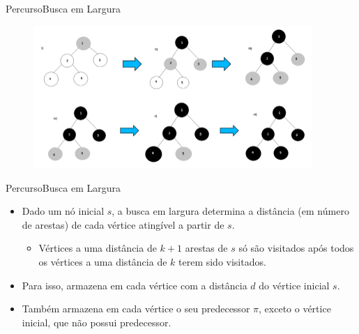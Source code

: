 \documentclass[aspectratio=169]{beamer}
\begin{document}

\begin{frame}{Percurso}{Busca em Largura}
\begin{figure}[!h]
  \centering
  \includegraphics[width=300pt]{imagens/breadth_first_search.png}
  \label{fig_breadth_first_search}
\end{figure}
\end{frame}


\begin{frame}{Percurso}{Busca em Largura}
\begin{itemize}
\item Dado um nó inicial $s$, a busca em largura determina a distância (em número de arestas) de cada vértice atingível a partir de $s$.
\begin{itemize}
\item Vértices a uma distância de $k+1$ arestas de $s$ só são visitados após todos os vértices a uma distância de $k$ terem sido visitados.
\end{itemize}
\item Para isso, armazena em cada vértice com a distância $d$ do vértice inicial $s$.
\item Também armazena em cada vértice o seu predecessor $\pi$, exceto o vértice inicial, que não possui predecessor.
\end{itemize}
\end{frame}

\end{document}
